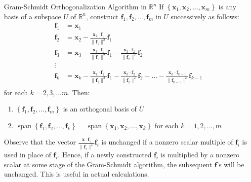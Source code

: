 \documentclass[12pt]{article}
\begin{document}
\begin{theorem}{Gram-Schmidt Orthogonalization Algorithm in $ \mathbb{R}^n $}{}
    If $ \left\{ \mathbf{x}_1, \mathbf{x}_2, \dots, \mathbf{x}_m \right\} $ is any basis of a subspace $ U $ of $ \mathbb{R}^n $, construct $ \mathbf{f}_1, \mathbf{f}_2, \dots, \mathbf{f}_m $ in $ U $ successively as follows:
    \begin{align*}
        \mathbf{f}_1 & = \mathbf{x}_1 \\
        \mathbf{f}_2 & = \mathbf{x}_2 - \frac{\mathbf{x}_2 \cdot \mathbf{f}_1}{\lVert \mathbf{f}_1 \rVert^2} \mathbf{f}_1 \\
        \mathbf{f}_3 & = \mathbf{x}_3 - \frac{\mathbf{x}_3 \cdot \mathbf{f}_1}{\lVert \mathbf{f}_1 \rVert^2} \mathbf{f}_1 - \frac{\mathbf{x}_3 \cdot \mathbf{f}_2}{\lVert \mathbf{f}_2 \rVert^2} \mathbf{f}_2 \\
        \vdots \\
        \mathbf{f}_k & = \mathbf{x}_k - \frac{\mathbf{x}_k \cdot \mathbf{f}_1}{\lVert \mathbf{f}_1 \rVert^2} \mathbf{f}_1 - \frac{\mathbf{x}_k \cdot \mathbf{f}_2}{\lVert \mathbf{f}_2 \rVert^2} \mathbf{f}_2 - \dots - \frac{\mathbf{x}_k \cdot \mathbf{f}_{k - 1}}{\lVert \mathbf{f}_{k - 1} \rVert^2} \mathbf{f}_{k - 1} \\
    \end{align*}
    for each $ k = 2, 3, \dots m $. Then:
    \begin{enumerate}[label=(\roman*)]
        \item $ \left\{ \mathbf{f}_1, \mathbf{f}_2, \dots, \mathbf{f}_m \right\} $ is an orthogonal basis of $ U $
        \item $ \operatorname{span} \left\{ \mathbf{f}_1, \mathbf{f}_2, \dots, \mathbf{f}_k \right\} = \operatorname{span} \left\{ \mathbf{x}_1, \mathbf{x}_2, \dots, \mathbf{x}_k \right\} $ for each $ k = 1, 2, \dots, m $
    \end{enumerate}
\end{theorem}

\begin{remark}{}{}
    Observe that the vector $ \frac{\mathbf{x} \cdot \mathbf{f}_i}{\lVert \mathbf{f}_i \rVert^2} \mathbf{f}_i $ is unchanged if a nonzero scalar multiple of $ \mathbf{f}_i $ is used in place of $ \mathbf{f}_i $. Hence, if a newly constructed $ \mathbf{f}_i $ is multiplied by a nonzero scalar at some stage of the Gram-Schmidt algorithm, the subsequent $ \mathbf{f} $'s will be unchanged. This is useful in actual calculations.
\end{remark}
\end{document}
